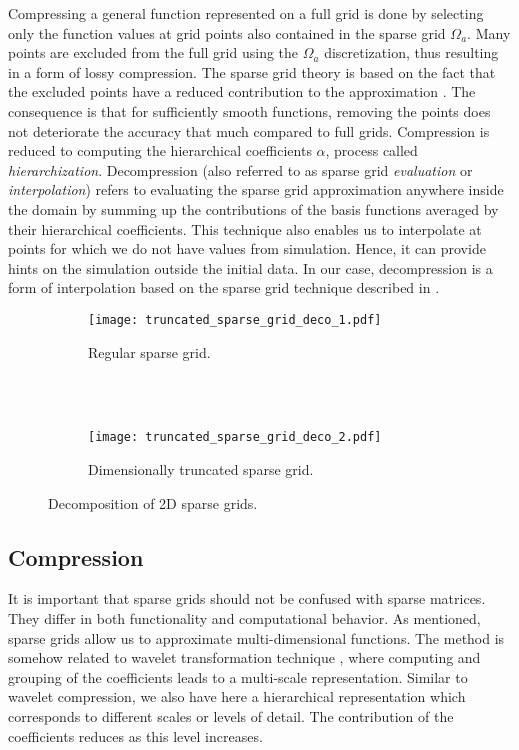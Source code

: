 Compressing a general function represented on a full grid is done by selecting
only the function values at grid points also contained in the sparse grid $\Omega_a$. 
Many points are excluded from the full grid using the $\Omega_a$ discretization,
thus resulting in a form of lossy compression. 
The sparse grid theory is based on the fact that the excluded points have a reduced 
contribution to the approximation \cite{CambridgeJournals:227245}. The consequence is
that for sufficiently smooth functions, removing the points does not deteriorate the
accuracy that much compared to full grids. 
Compression is reduced to computing the hierarchical coefficients $\alpha$,
process called \textit{hierarchization}. Decompression (also referred to as
sparse grid \textit{evaluation} or \textit{interpolation}) refers to evaluating
the sparse grid approximation anywhere inside the domain by summing up the
contributions of the basis functions averaged by their hierarchical
coefficients. This technique also enables us to interpolate at points for which
we do not have values from simulation. Hence, it can provide hints on the
simulation outside the initial data. In our case, decompression is a form of
interpolation based on the sparse grid technique described in
\cite{CambridgeJournals:227245}.

\begin{figure}[t]
  \begin{subfigure}[b]{1\linewidth}
    \centering
    \texttt{[image: truncated\_sparse\_grid\_deco\_1.pdf]}
    \caption{Regular sparse grid.}
    \label{fig:truncated_sparse_grid_deco_1}
  \end{subfigure}
  \\ \\
  \begin{subfigure}[b]{1\linewidth}
    \centering
    \texttt{[image: truncated\_sparse\_grid\_deco\_2.pdf]}
    \caption{Dimensionally truncated sparse grid.}
    \label{fig:truncated_sparse_grid_deco_2}
  \end{subfigure}
  \caption{Decomposition of 2D sparse grids.}
  \label{fig:truncated_sparse_grid_deco}
\end{figure}

\subsection{Compression}

It is important that sparse grids should not be confused with sparse matrices.
They differ in both functionality and computational behavior. As mentioned,
sparse grids allow us to approximate multi-dimensional functions. The method is
somehow related to wavelet transformation technique \cite{Mallat89atheory},
where computing and grouping of the coefficients leads to a multi-scale representation. 
Similar to wavelet compression, we also have here a hierarchical representation which corresponds
to different scales or levels of detail. The contribution of the coefficients reduces as
this level increases.

